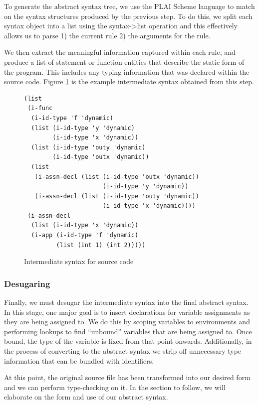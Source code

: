 To generate the abstract syntax tree, we use the PLAI Scheme language \cite{plaischeme} to match on the syntax structures produced by the previous step. To do this, we split each syntax object into a list using the syntax->list operation and this effectively allows us to parse 1) the current rule 2) the arguments for the rule.

We then extract the meaningful information captured within each rule, and produce a list of statement or function entities that describe the static form of the program. This includes any typing information that was declared within the source code. Figure \ref{fig:intermediate} is the example intermediate syntax obtained from this step.

\begin{figure}[h]
    \begin{lstlisting}[language=racket]
(list
 (i-func
  (i-id-type 'f 'dynamic)
  (list (i-id-type 'y 'dynamic)
        (i-id-type 'x 'dynamic))
  (list (i-id-type 'outy 'dynamic)
        (i-id-type 'outx 'dynamic))
  (list
   (i-assn-decl (list (i-id-type 'outx 'dynamic))
                      (i-id-type 'y 'dynamic))
   (i-assn-decl (list (i-id-type 'outy 'dynamic))
                      (i-id-type 'x 'dynamic))))
 (i-assn-decl
  (list (i-id-type 'x 'dynamic))
  (i-app (i-id-type 'f 'dynamic)
         (list (int 1) (int 2)))))
    \end{lstlisting}
    \caption[]{Intermediate syntax for source code}
    \label{fig:intermediate}
\end{figure}

\subsubsection{Desugaring}
Finally, we must desugar the intermediate syntax into the final abstract syntax. In this stage, one major goal is to insert declarations for variable assignments as they are being assigned to. We do this by scoping variables to environments and performing lookups to find ``unbound'' variables that are being assigned to. Once bound, the type of the variable is fixed from that point onwards. Additionally, in the process of converting to the abstract syntax we strip off unnecessary type information that can be bundled with identifiers.

At this point, the original source file has been transformed into our desired form and we can perform type-checking on it. In the section to follow, we will elaborate on the form and use of our abstract syntax.

